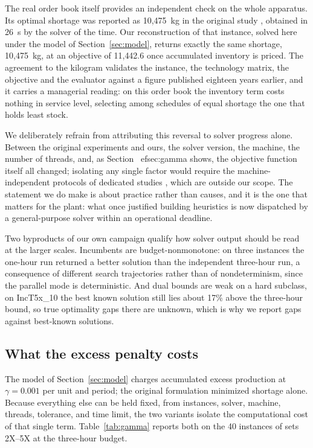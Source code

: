The real order book itself provides an independent check on the
whole apparatus. Its optimal shortage was reported as 10{,}475~kg in
the original study \citep[Section~4.2]{luche2009combining}, obtained
in 26~s by the solver of the time. Our reconstruction of that instance,
solved here under the model of Section~\ref{sec:model}, returns
exactly the same shortage, 10{,}475~kg, at an objective of
11{,}442.6 once accumulated inventory is priced. The agreement to the
kilogram validates the instance, the technology matrix, the objective
and the evaluator against a figure published eighteen years earlier,
and it carries a managerial reading: on this order book the inventory
term costs nothing in service level, selecting among schedules of
equal shortage the one that holds least stock.

We deliberately refrain from attributing this reversal to solver
progress alone. Between the original experiments and ours, the solver
version, the machine, the number of threads, and, as Section~
ef{sec:gamma} shows, the objective function itself all
changed; isolating any single factor would require the
machine-independent protocols of dedicated studies
\citep{koch2022progress,achterberg2013analyzing}, which are outside our
scope. The statement we do make is about practice rather than causes,
and it is the one that matters for the plant: what once justified
building heuristics is now dispatched by a general-purpose solver
within an operational deadline.

Two byproducts of our own campaign qualify how solver output should be
read at the larger scales. Incumbents are budget-nonmonotone: on three
instances the one-hour run returned a better solution than the
independent three-hour run, a consequence of different search
trajectories rather than of nondeterminism, since the parallel mode is
deterministic. And dual bounds are weak on a hard subclass, on
IncT5x\_10 the best known solution still lies about 17\% above the
three-hour bound, so true optimality gaps there are unknown, which is
why we report gaps against best-known solutions.

\subsection{What the excess penalty costs}
\label{sec:gamma}

The model of Section~\ref{sec:model} charges accumulated excess
production at $\gamma=0.001$ per unit and period; the original
formulation minimized shortage alone. Because everything else can be
held fixed, from instances, solver, machine, threads, tolerance, and
time limit, the two variants isolate the computational cost of that
single term. Table~\ref{tab:gamma} reports both on the 40
instances of sets 2X--5X at the three-hour budget.

